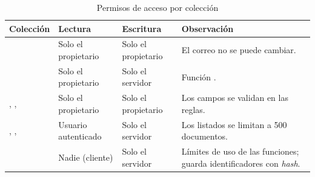\begin{table}[H]
\centering
\small
\begin{tabularx}{\textwidth}{|L{4.4cm}|L{2.7cm}|L{2.7cm}|Y|}
\hline
{} \textbf{Colección} & \textbf{Lectura} & \textbf{Escritura} & \textbf{Observación} \\
\hline
{} & Solo el propietario & Solo el propietario & El correo no se puede cambiar. \\ \hline
{} & Solo el propietario & Solo el servidor & Función . \\ \hline
{}, ,  & Solo el propietario & Solo el propietario & Los campos se validan en las reglas. \\ \hline
{}, ,  & Usuario autenticado & Solo el servidor & Los listados se limitan a 500 documentos. \\ \hline
{} & Nadie (cliente) & Solo el servidor & Límites de uso de las funciones; guarda identificadores con \emph{hash}. \\
\hline
\end{tabularx}
\caption{Permisos de acceso por colección}
\label{tab:dd-permisos}
\end{table}
